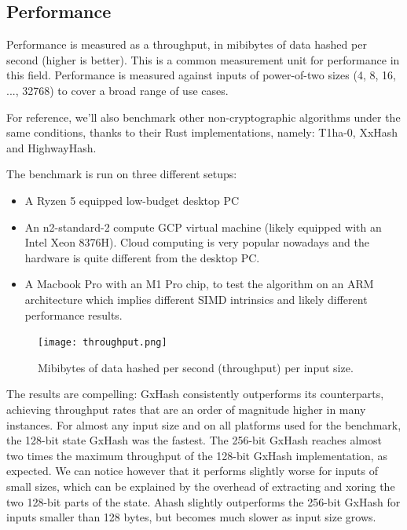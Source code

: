 \documentclass[10pt]{article}
\begin{document}
\clearpage
\subsection{Performance}

Performance is measured as a throughput, in mibibytes of data hashed per second (higher is better). This is a common measurement unit for performance in this field. Performance is measured against inputs of power-of-two sizes (4, 8, 16, ..., 32768) to cover a broad range of use cases.

For reference, we'll also benchmark other non-cryptographic algorithms under the same conditions, thanks to their Rust implementations, namely: T1ha-0\cite{rust-t1ha}, XxHash\cite{twox-hash} and HighwayHash\cite{highway-rs}.

The benchmark is run on three different setups:
\begin{itemize}
    \item A Ryzen 5 equipped low-budget desktop PC
    \item An n2-standard-2 compute GCP virtual machine (likely equipped with an Intel Xeon 8376H). Cloud computing is very popular nowadays and the hardware is quite different from the desktop PC.
    \item A Macbook Pro with an M1 Pro chip, to test the algorithm on an ARM architecture which implies different SIMD intrinsics and likely different performance results.
\end{itemize}

\begin{figure}[H]
\centering
\texttt{[image: throughput.png]}
\caption{Mibibytes of data hashed per second (throughput) per input size.}
\label{fig:benchmark-throughput}
\end{figure}

The results are compelling: GxHash consistently outperforms its counterparts, achieving throughput rates that are an order of magnitude higher in many instances. For almost any input size and on all platforms used for the benchmark, the 128-bit state GxHash was the fastest.
The 256-bit GxHash reaches almost two times the maximum throughput of the 128-bit GxHash implementation, as expected. We can notice however that it performs slightly worse for inputs of small sizes, which can be explained by the overhead of extracting and xoring the two 128-bit parts of the state. Ahash slightly outperforms the 256-bit GxHash for inputs smaller than 128 bytes, but becomes much slower as input size grows.
\end{document}
